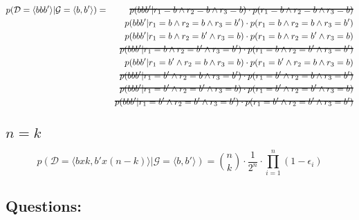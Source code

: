 \documentclass[a4paper,12pt]{article}
\newcommand\hcancel[2][black]{\setbox0=\hbox{$#2$}%
\rlap{\raisebox{.45\ht0}{\textcolor{#1}{\rule{\wd0}{1pt}}}}#2}
\begin{document}
\begin{eqnarray*}
p(\mathcal{D} = \langle bbb' \rangle| \mathcal{G} = \langle b,b' \rangle) & = &  \hcancel{p( bbb' | r_1 = b  \land r_2 = b \land r_3 = b ) \cdot p( r_1 = b  \land r_2 = b \land r_3 = b  ) } \\
                                                                          &   &  p( bbb' | r_1 = b  \land r_2 = b \land r_3 = b' ) \cdot p( r_1 = b  \land r_2 = b \land r_3 = b'  ) \\
                                                                          &   &  p( bbb' | r_1 = b  \land r_2 = b' \land r_3 = b ) \cdot p( r_1 = b  \land r_2 = b' \land r_3 = b  ) \\
                                                                          &   &  \hcancel{p( bbb' | r_1 = b  \land r_2 = b' \land r_3 = b' ) \cdot p( r_1 = b  \land r_2 = b' \land r_3 = b'  ) }\\
%                                                                         
                                                                          &   &  p( bbb' | r_1 = b'  \land r_2 = b \land r_3 = b ) \cdot p( r_1 = b'  \land r_2 = b \land r_3 = b  ) \\
                                                                          &   &  \hcancel{p( bbb' | r_1 = b'  \land r_2 = b \land r_3 = b' ) \cdot p( r_1 = b'  \land r_2 = b \land r_3 = b'  )} \\
                                                                          &   &  \hcancel{p( bbb' | r_1 = b'  \land r_2 = b' \land r_3 = b ) \cdot p( r_1 = b'  \land r_2 = b' \land r_3 = b  )} \\
                                                                          &   &  \hcancel{p( bbb' | r_1 = b'  \land r_2 = b' \land r_3 = b' ) \cdot p( r_1 = b'  \land r_2 = b' \land r_3 = b'  ) } \\
\end{eqnarray*}

\subsection{$n=k$}
\begin{equation}
p(\mathcal{D} = \langle bxk , b'x(n-k) \rangle| \mathcal{G} = \langle b,b' \rangle) = {n \choose k} \cdot \frac {1} {2^n} \cdot \prod_{i=1}^n (1-\epsilon_{i})
\end{equation}


\subsection{Questions:}
\end{document}
